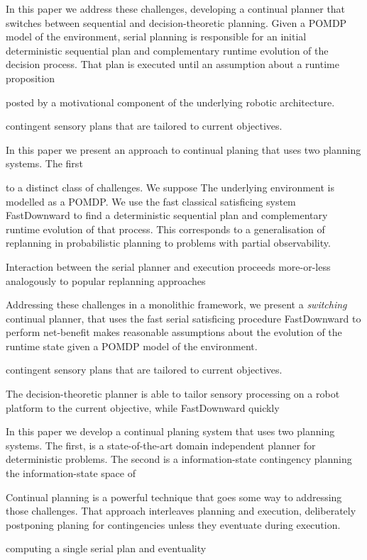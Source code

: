 \documentclass[letterpaper]{article}
\begin{document}
In this paper we address these challenges, developing a continual
planner that switches between sequential and decision-theoretic
planning. Given a POMDP model of the environment, serial planning is
responsible for an initial deterministic sequential plan and
complementary runtime evolution of the decision process. That plan is
executed until an assumption about a runtime proposition

posted by a motivational component of the underlying robotic
architecture. 

contingent sensory plans that are tailored to current
objectives.

In this paper we present an approach to continual planing that uses
two planning systems. The first 

 to a distinct class of
challenges. We suppose 
The underlying environment is modelled as a POMDP. We use the fast
classical satisficing system FastDownward to find a deterministic
sequential plan and complementary runtime evolution of that
process. This corresponds to a generalisation of replanning in
probabilistic planning to problems with partial observability.

Interaction between the serial planner and execution proceeds
more-or-less analogously to popular replanning approaches

Addressing these challenges in a monolithic framework, we present a
{\em switching} continual planner, that uses the fast serial
satisficing procedure FastDownward to perform net-benefit
makes reasonable assumptions about the evolution of the runtime state
given a POMDP model of the environment. 

contingent sensory plans that are tailored to current
objectives.


The decision-theoretic planner is able to tailor sensory processing on
a robot platform to the current objective, while FastDownward  quickly 


In this paper we develop a continual planing system that uses two
planning systems. The first, is a state-of-the-art domain independent
planner for deterministic problems. The second is a information-state
contingency planning the information-state space of 


Continual planning is a powerful technique that goes some way to
addressing those challenges. That approach interleaves planning and
execution, deliberately postponing planing for contingencies unless
they eventuate during execution. 


computing a single serial plan and
eventuality
\end{document}
